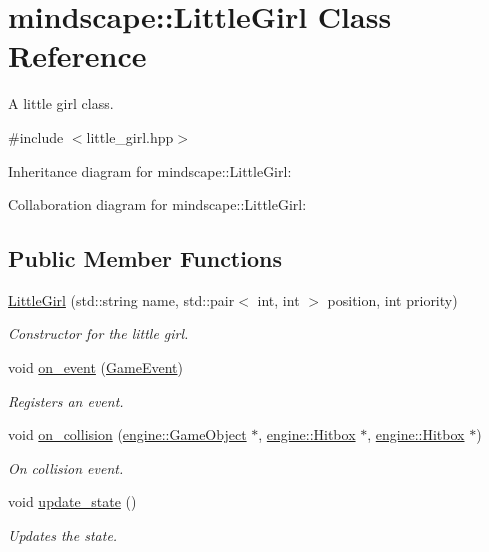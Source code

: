 \hypertarget{classmindscape_1_1_little_girl}{}\section{mindscape\+:\+:Little\+Girl Class Reference}
\label{classmindscape_1_1_little_girl}


A little girl class.  




{\ttfamily \#include $<$little\+\_\+girl.\+hpp$>$}



Inheritance diagram for mindscape\+:\+:Little\+Girl\+:


Collaboration diagram for mindscape\+:\+:Little\+Girl\+:
\subsection*{Public Member Functions}
\begin{DoxyCompactItemize}
\item 
\hyperlink{classmindscape_1_1_little_girl_aaa59cbc3cb94acf4004c39c670275ee9}{Little\+Girl} (std\+::string name, std\+::pair$<$ int, int $>$ position, int priority)
\begin{DoxyCompactList}\small\item\em Constructor for the little girl. \end{DoxyCompactList}\item 
void \hyperlink{classmindscape_1_1_little_girl_aaebf64e03ace85b494da14cad0343207}{on\+\_\+event} (\hyperlink{class_game_event}{Game\+Event})
\begin{DoxyCompactList}\small\item\em Registers an event. \end{DoxyCompactList}\item 
void \hyperlink{classmindscape_1_1_little_girl_a9b90c01bbe0510338a8dce10f07eff2a}{on\+\_\+collision} (\hyperlink{classengine_1_1_game_object}{engine\+::\+Game\+Object} $\ast$, \hyperlink{classengine_1_1_hitbox}{engine\+::\+Hitbox} $\ast$, \hyperlink{classengine_1_1_hitbox}{engine\+::\+Hitbox} $\ast$)
\begin{DoxyCompactList}\small\item\em On collision event. \end{DoxyCompactList}\item 
void \hyperlink{classmindscape_1_1_little_girl_ac371a4bf4f1d4204eec7fb84551e6745}{update\+\_\+state} ()
\begin{DoxyCompactList}\small\item\em Updates the state. \end{DoxyCompactList}\end{DoxyCompactItemize}
